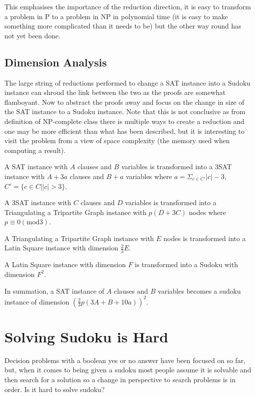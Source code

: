 \documentclass[a4paper,11pt]{report}
\begin{document}
This emphasises the importance of the reduction direction, it is easy to transform a problem in P to a problem in NP in polynomial time (it is easy to make something more complicated than it needs to be) but the other way round has not yet been done. 

\subsection{Dimension Analysis}

The large string of reductions performed to change a SAT instance into a Sudoku instance can shroud the link between the two as the proofs are somewhat flamboyant. Now to abstract the proofs away and focus on the change in size of the SAT instance to a Sudoku instance. Note that this is not conclusive as from definition of NP-complete class there is multiple ways to create a reduction and one may be more efficient than what has been described, but it is interesting to visit the problem from a view of space complexity (the memory used when computing a result).

A SAT instance with $A$ clauses and $B$ variables is transformed into a 3SAT instance with $A + 3a$ clauses and $B+a$ variables where $a=\Sigma_{c\in C'}|c|-3$, $C'=\{c\in C | |c|>3\}$. 

A 3SAT instance with $C$ clauses and $D$ variables is transformed into a Triangulating a Tripartite Graph instance with $p(D+3C)$ nodes where $p\equiv 0 (\text{mod}3)$.

A Triangulating a Tripartite Graph instance with $E$ nodes is transformed into a Latin Square instance with dimension $\frac{2}{3}E$.

A Latin Square instance with dimension $F$ is transformed into a Sudoku with dimension $F^2$.

In summation, a SAT instance of $A$ clauses and $B$ variables becomes a sudoku instance of dimension $(\frac{2}{3}p(3A+B+10a))^2 $.

\section{Solving Sudoku is Hard}

Decision problems with a boolean yes or no answer have been focused on so far, but, when it comes to being given a sudoku most people assume it is solvable and then search for a solution so a change in perspective to search problems is in order. Is it hard to solve sudoku? 
\end{document}
